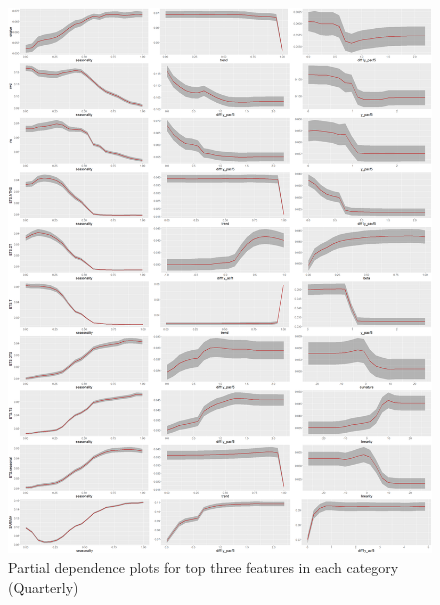 \documentclass[11pt,a4paper,]{article}
\theoremstyle{definition}
\theoremstyle{definition}
\theoremstyle{definition}
\theoremstyle{remark}
\begin{document}
\newpage

\begin{figure}
\centering
\includegraphics{figures/pdpquarterly1-1.png}
\caption{\label{fig:pdpquarterly1}Partial dependence plots for top three
features in each category (Quarterly)}
\end{figure}

\newpage
\end{document}
